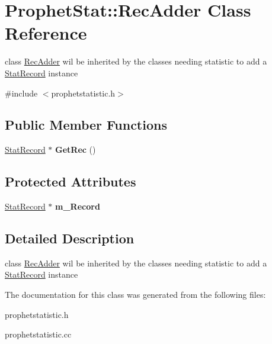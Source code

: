 \hypertarget{classProphetStat_1_1RecAdder}{
\section{ProphetStat::RecAdder Class Reference}
\label{classProphetStat_1_1RecAdder}
}


class \hyperlink{classProphetStat_1_1RecAdder}{RecAdder} wil be inherited by the classes needing statistic to add a \hyperlink{classProphetStat_1_1StatRecord}{StatRecord} instance  




{\ttfamily \#include $<$prophetstatistic.h$>$}

\subsection*{Public Member Functions}
\begin{DoxyCompactItemize}
\item 
\hypertarget{classProphetStat_1_1RecAdder_a2b6cd4108f1c802cc64a7f38e8af00bc}{
\hyperlink{classProphetStat_1_1StatRecord}{StatRecord} $\ast$ {\bfseries GetRec} ()}
\label{classProphetStat_1_1RecAdder_a2b6cd4108f1c802cc64a7f38e8af00bc}

\end{DoxyCompactItemize}
\subsection*{Protected Attributes}
\begin{DoxyCompactItemize}
\item 
\hypertarget{classProphetStat_1_1RecAdder_a5b617fa4c74960bca50be4e7f6a216d6}{
\hyperlink{classProphetStat_1_1StatRecord}{StatRecord} $\ast$ {\bfseries m\_\-Record}}
\label{classProphetStat_1_1RecAdder_a5b617fa4c74960bca50be4e7f6a216d6}

\end{DoxyCompactItemize}


\subsection{Detailed Description}
class \hyperlink{classProphetStat_1_1RecAdder}{RecAdder} wil be inherited by the classes needing statistic to add a \hyperlink{classProphetStat_1_1StatRecord}{StatRecord} instance 

The documentation for this class was generated from the following files:\begin{DoxyCompactItemize}
\item 
prophetstatistic.h\item 
prophetstatistic.cc\end{DoxyCompactItemize}
